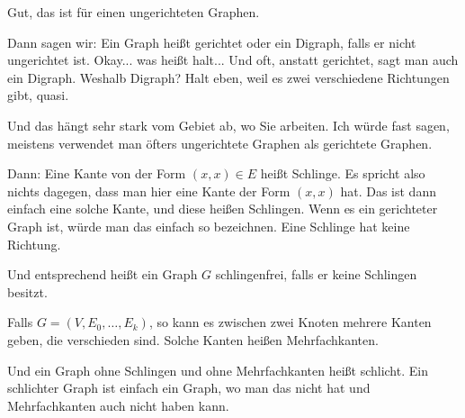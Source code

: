 \begin{spoken-clean}[00:22:55 - 00:25:32]
Gut, das ist für einen ungerichteten Graphen.

Dann sagen wir: Ein Graph heißt gerichtet oder ein Digraph, falls er nicht ungerichtet ist. Okay... was heißt  halt... Und oft, anstatt gerichtet, sagt man auch ein Digraph. Weshalb Digraph? Halt eben, weil es zwei verschiedene Richtungen gibt, quasi.

Und das hängt sehr stark vom Gebiet ab, wo Sie arbeiten. Ich würde fast sagen, meistens verwendet man öfters ungerichtete Graphen als gerichtete Graphen.

Dann: Eine Kante von der Form $(x, x) \in E$ heißt Schlinge. Es spricht also nichts dagegen, dass man hier eine Kante der Form $(x, x)$ hat. Das ist dann einfach eine solche Kante, und diese heißen Schlingen. Wenn es ein gerichteter Graph ist, würde man das einfach so bezeichnen. Eine Schlinge hat keine Richtung.

Und entsprechend heißt ein Graph $G$ schlingenfrei, falls er keine Schlingen besitzt.

Falls $G = (V, E_0, \dots, E_k)$, so kann es zwischen zwei Knoten mehrere Kanten geben, die verschieden sind. Solche Kanten heißen Mehrfachkanten.

Und ein Graph ohne Schlingen und ohne Mehrfachkanten heißt schlicht. Ein schlichter Graph ist einfach ein Graph, wo man das nicht hat und Mehrfachkanten auch nicht haben kann.
\end{spoken-clean}


